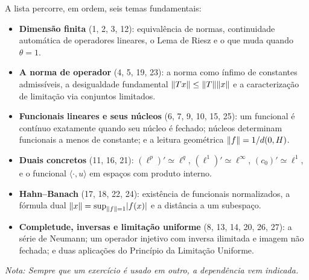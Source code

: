 \begin{tcolorbox}[
  enhanced,
  breakable,
  colback=myexamplebg,
  colframe=myexampleti,
  boxrule=0sp,
  borderline west={2.5pt}{0pt}{myexampleti},
  sharp corners,
  title=\textbf{Roteiro Temático da Lista},
  coltitle=myexampleti,
  fonttitle=\bfseries\sffamily,
  detach title,
  before upper=\tcbtitle\par\smallskip
]
A lista percorre, em ordem, seis temas fundamentais:
\begin{itemize}[leftmargin=1.4em,itemsep=2pt]
\item \textbf{Dimensão finita} (1, 2, 3, 12): equivalência de normas, continuidade automática de operadores lineares, o Lema de Riesz e o que muda quando $\theta=1$.
\item \textbf{A norma de operador} (4, 5, 19, 23): a norma como ínfimo de constantes admissíveis, a desigualdade fundamental $\lVert Tx\rVert\le\lVert T\rVert\lVert x\rVert$ e a caracterização de limitação via conjuntos limitados.
\item \textbf{Funcionais lineares e seus núcleos} (6, 7, 9, 10, 15, 25): um funcional é contínuo exatamente quando seu núcleo é fechado; núcleos determinam funcionais a menos de constante; e a leitura geométrica $\lVert f\rVert=1/d(0,H)$.
\item \textbf{Duais concretos} (11, 16, 21): $(\ell^p)'\simeq \ell^q$, $(\ell^1)'\simeq \ell^\infty$, $(c_0)'\simeq \ell^1$, e o funcional $\langle\cdot,u\rangle$ em espaços com produto interno.
\item \textbf{Hahn--Banach} (17, 18, 22, 24): existência de funcionais normalizados, a fórmula dual $\lVert x\rVert=\sup_{\lVert f\rVert=1}\lvert f(x)\rvert$ e a distância a um subespaço.
\item \textbf{Completude, inversas e limitação uniforme} (8, 13, 14, 20, 26, 27): a série de Neumann; um operador injetivo com inversa ilimitada e imagem não fechada; e duas aplicações do Princípio da Limitação Uniforme.
\end{itemize}
\medskip
\noindent\footnotesize\textit{Nota: Sempre que um exercício é usado em outro, a dependência vem indicada.}
\end{tcolorbox}
\vspace{4mm}
